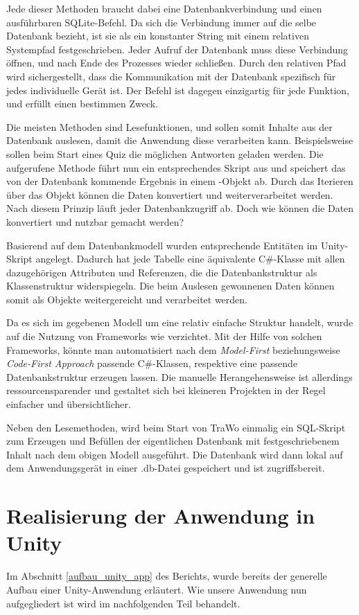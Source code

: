Jede dieser Methoden braucht dabei eine Datenbankverbindung und einen ausführbaren SQLite-Befehl. Da sich die Verbindung immer auf die selbe Datenbank bezieht, ist sie als ein konstanter String mit einem relativen Systempfad festgeschrieben. Jeder Aufruf der Datenbank muss diese Verbindung öffnen, und nach Ende des Prozesses wieder schließen. Durch den relativen Pfad wird sichergestellt, dass die Kommunikation mit der Datenbank spezifisch für jedes individuelle Gerät ist. Der Befehl ist dagegen einzigartig für jede Funktion, und erfüllt einen bestimmen Zweck.

Die meisten Methoden sind Lesefunktionen, und sollen somit Inhalte aus der Datenbank auslesen, damit die Anwendung diese verarbeiten kann. Beispielsweise sollen beim Start eines Quiz die möglichen Antworten geladen werden. Die aufgerufene Methode führt nun ein entsprechendes Skript aus und speichert das von der Datenbank kommende Ergebnis in einem -Objekt ab. Durch das Iterieren über das Objekt können die Daten konvertiert und weiterverarbeitet werden. Nach diesem Prinzip läuft jeder Datenbankzugriff ab. Doch wie können die Daten konvertiert und nutzbar gemacht werden?

Basierend auf dem Datenbankmodell wurden entsprechende Entitäten im Unity-Skript angelegt. Dadurch hat jede Tabelle eine äquivalente C\#-Klasse mit allen dazugehörigen Attributen und Referenzen, die die Datenbankstruktur als Klassenstruktur widerspiegeln. Die beim Auslesen gewonnenen Daten können somit als Objekte weitergereicht und verarbeitet werden. 

Da es sich im gegebenen Modell um eine relativ einfache Struktur handelt, wurde auf die Nutzung von Frameworks wie  verzichtet. Mit der Hilfe von solchen Frameworks, könnte man automatisiert nach dem \textit{Model-First} beziehungsweise \textit{Code-First Approach} passende C\#-Klassen, respektive eine passende Datenbankstruktur erzeugen lassen. Die manuelle Herangehensweise ist allerdings ressourcensparender und gestaltet sich bei kleineren Projekten in der Regel einfacher und übersichtlicher.

Neben den Lesemethoden, wird beim Start von TraWo einmalig ein SQL-Skript zum Erzeugen und Befüllen der eigentlichen Datenbank mit festgeschriebenem Inhalt nach dem obigen Modell ausgeführt. Die Datenbank wird dann lokal auf dem Anwendungsgerät in einer .db-Datei gespeichert und ist zugriffsbereit. 

\section{Realisierung der Anwendung in Unity}\label{realisierung_unity}
Im Abschnitt \ref{aufbau_unity_app} des Berichts, wurde bereits der generelle Aufbau einer Unity-Anwendung erläutert.
Wie unsere Anwendung nun aufgegliedert ist wird im nachfolgenden Teil behandelt.

